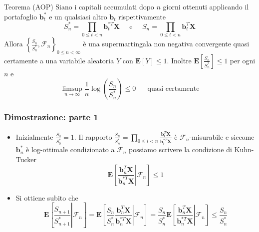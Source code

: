 \documentclass{beamer}
\theoremstyle{plain}
\theoremstyle{definition}
\theoremstyle{remark}
\newcommand{\X}{\bm{X}}
\newcommand{\B}{\bm{b}}
\newcommand{\F}{\mathcal{F}}
\newcommand{\E}{\mathbf{E}}
\begin{document}
\begin{frame}
		\begin{block}{Teorema (AOP)}
		Siano i capitali accumulati dopo $n$ giorni ottenuti applicando il portafoglio $\B_t^*$ e un qualsiasi altro $\B_t$ rispettivamente
		\begin{equation*}
		S_n^*=\prod_{0\leq t <n}{\B_t^{*T}\X} \;\;\;\;\; \text{e} \;\;\;\;\; S_n=\prod_{0\leq t <n}{\B_t^T\X}
		\end{equation*}
		Allora $\left\{\frac{S_n}{S^*_n}, \F_n\right\}_{0\leq n <\infty}$ è una supermartingala non negativa convergente quasi certamente a una variabile aleatoria $Y$ con $\E[Y]\leq 1$. Inoltre $\E\left[\frac{S_n}{S_n^*}\right]\leq 1$ per ogni $n$ e
		\begin{equation*}
		\limsup\limits_{n\to\infty}\frac{1}{n}\log\left(\frac{S_n}{S_n^*}\right)\leq 0 \;\;\;\;\;\; \text{quasi certamente}
		\end{equation*}
	\end{block}
\hyperlink{postAOP}{}
\end{frame}


\begin{frame}
	\frametitle{Dimostrazione: parte 1}
	\begin{itemize}
		\item Inizialmente $\frac{S_0}{S_0^*}=1$. Il rapporto $\frac{S_n}{S_n^*}=\prod_{0\leq i <n}{\frac{\B_t^T\X}{\B_t^{*T}\X}}$ è $\F_n$-misurabile e siccome $\B_n^*$ è log-ottimale condizionato a $\F_n$ possiamo scrivere la condizione di Kuhn-Tucker
		\begin{equation}
		\E\left[\left.\frac{\B_n^T\X}{\B_n^{*T}\X}\right| \F_n\right]\leq 1
		\end{equation}
		\item Si ottiene subito che
		\begin{equation*}
		\E\left[\left.\frac{S_{n+1}}{S^*_{n+1}}\right| \F_n\right]=\E\left[\left.\frac{S_n}{S_n^*}\frac{\B_n^T\X}{\B_n^{*T}\X}\right| \F_n\right] = \frac{S_n}{S_n^*}\E\left[\left.\frac{\B_n^T\X}{\B_n^{*T}\X}\right| \F_n\right]\leq \frac{S_n}{S_n^*}
		\end{equation*}
	\end{itemize}
\end{frame}
\end{document}
